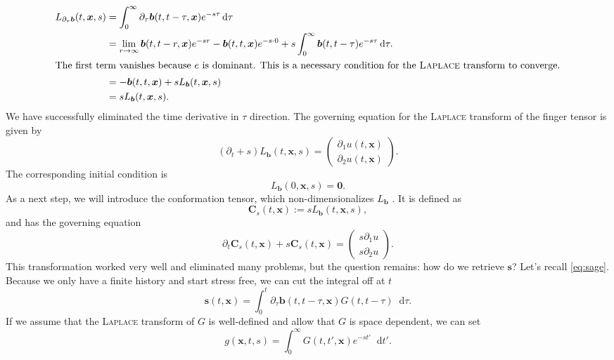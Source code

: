 \documentclass[12pt,a4paper,twoside, open=right]{scrreprt}
\theoremstyle{definition}
\theoremstyle{plain}
\newcommand{\bfb}{\bm{b}}
\newcommand{\bfs}{\bm{s}}
\newcommand{\bfC}{\bm{C}}
\newcommand{\bfx}{\bm{x}}
\newcommand{\D}{\mathop{}\!\mathrm{d}}
\begin{document}
\begin{align}
    L_{\partial_\tau\bfb}(t,\bfx,s) &= \int_0^\infty\partial_\tau\bfb(t,t-\tau,\bfx)e^{-s\tau}\D\tau\\ &=\lim_{r\to\infty}\bfb(t,t-r,\bfx)e^{-sr}-\bfb(t,t,\bfx)e^{-s\cdot 0}+s\int_0^\infty\bfb(t,t-\tau)e^{-s\tau}\D\tau.\\
    \intertext{The first term vanishes because $e$ is dominant. This is a necessary condition for the \textsc{Laplace} transform to converge.}
    &= -\bfb(t,t,\bfx) +sL_{\bfb}(t,\bfx, s)\\
    &= sL_{\bfb}(t,\bfx,s).
\end{align}
We have successfully eliminated the time derivative in $\tau$ direction. The governing equation for the \textsc{Laplace} transform of the finger tensor is given by
\begin{equation}
(\partial_t +s)L_{\bfb}(t,\bfx,s) = \begin{pmatrix}
\partial_1 u(t,\bfx)\\\partial_2 u(t,\bfx)
\end{pmatrix}.
\end{equation}
The corresponding initial condition is 
\begin{equation}
    L_{\bfb}(0,\bfx,s) = \bm{0}.
\end{equation} 
As a next step, we will introduce the conformation tensor, which non-dimensionalizes $L_{\bfb}$ . It is defined as 
\begin{equation}
    \bfC_s(t,\bfx) := sL_{\bfb}(t,\bfx,s),
\end{equation}
and has the governing equation
\begin{equation}
    \partial_t\bfC_s(t,\bfx)+s\bfC_s(t,\bfx) =\begin{pmatrix}
    s\partial_1u\\s\partial_2 u
    \end{pmatrix}.
\end{equation}
This transformation worked very well and eliminated many problems, but the question remains: how do we retrieve $\bfs$?
Let's recall \eqref{eq:sage}.
Because we only have a finite history and start stress free, we can cut the integral off at $t$
\begin{equation}
    \bfs(t,\bfx)=\int_0^t\partial_\tau\bfb(t,t-\tau,\bfx)G(t,t-\tau)\D\tau.\label{eq:sagered}
\end{equation}
If we assume that the \textsc{Laplace} transform of $G$ is well-defined and allow that $G$ is space dependent, we can set
\begin{equation}
    g(\bfx,t,s) =\int_0^\infty G(t,t',\bfx)e^{-st'}\D t'.
\end{equation}
\end{document}
